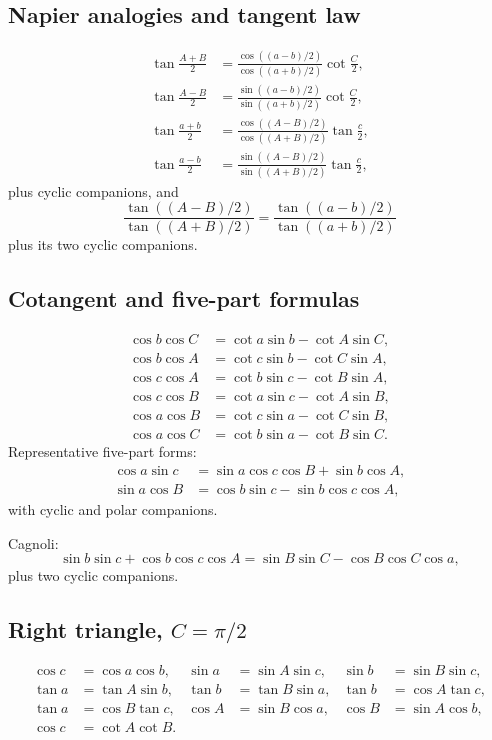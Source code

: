 \subsection{Napier analogies and tangent law}

\begin{align*}
\tan\frac{A+B}{2}&=
 \frac{\cos((a-b)/2)}{\cos((a+b)/2)}\cot\frac C2,\\
\tan\frac{A-B}{2}&=
 \frac{\sin((a-b)/2)}{\sin((a+b)/2)}\cot\frac C2,\\
\tan\frac{a+b}{2}&=
 \frac{\cos((A-B)/2)}{\cos((A+B)/2)}\tan\frac c2,\\
\tan\frac{a-b}{2}&=
 \frac{\sin((A-B)/2)}{\sin((A+B)/2)}\tan\frac c2,
\end{align*}
plus cyclic companions, and
\[
\frac{\tan((A-B)/2)}{\tan((A+B)/2)}
 =\frac{\tan((a-b)/2)}{\tan((a+b)/2)}
\]
plus its two cyclic companions.

\subsection{Cotangent and five-part formulas}

\begin{align*}
\cos b\cos C&=\cot a\sin b-\cot A\sin C,\\
\cos b\cos A&=\cot c\sin b-\cot C\sin A,\\
\cos c\cos A&=\cot b\sin c-\cot B\sin A,\\
\cos c\cos B&=\cot a\sin c-\cot A\sin B,\\
\cos a\cos B&=\cot c\sin a-\cot C\sin B,\\
\cos a\cos C&=\cot b\sin a-\cot B\sin C.
\end{align*}
Representative five-part forms:
\begin{align*}
\cos a\sin c&=\sin a\cos c\cos B+\sin b\cos A,\\
\sin a\cos B&=\cos b\sin c-\sin b\cos c\cos A,
\end{align*}
with cyclic and polar companions.

Cagnoli:
\[
\sin b\sin c+\cos b\cos c\cos A
 =\sin B\sin C-\cos B\cos C\cos a,
\]
plus two cyclic companions.

\subsection{Right triangle, \(C=\pi/2\)}

\begin{align*}
\cos c&=\cos a\cos b,&
\sin a&=\sin A\sin c,&
\sin b&=\sin B\sin c,\\
\tan a&=\tan A\sin b,&
\tan b&=\tan B\sin a,&
\tan b&=\cos A\tan c,\\
\tan a&=\cos B\tan c,&
\cos A&=\sin B\cos a,&
\cos B&=\sin A\cos b,\\
\cos c&=\cot A\cot B.&&
\end{align*}

